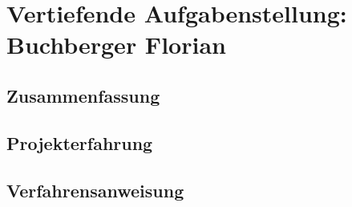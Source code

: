 \chapter[Buchberger]{Vertiefende Aufgabenstellung: Buchberger Florian}

\section{Zusammenfassung}

\section{Projekterfahrung}

\section{Verfahrensanweisung}